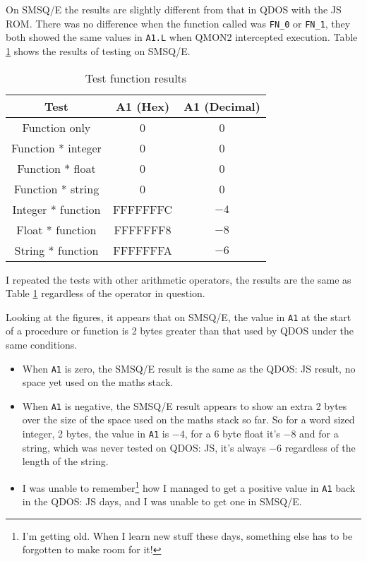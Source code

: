 On SMSQ/E the results are slightly different from that in QDOS with
the JS ROM. There was no difference when the function called was \texttt{FN\_0}
or \texttt{FN\_1}, they both showed the same values in \texttt{A1.L}
when QMON2 intercepted execution. Table \ref{tab:Test-function-results}
shows the results of testing on SMSQ/E.

\begin{table}[!h]
\begin{centering}
\begin{tabular}{|c|c|c|}
\hline 
\textbf{Test} & \textbf{A1 (Hex)} & \textbf{A1 (Decimal)}\tabularnewline
\hline 
\hline 
Function only & 0 & 0\tabularnewline
\hline 
Function {*} integer & 0 & 0\tabularnewline
\hline 
Function {*} float & 0 & 0\tabularnewline
\hline 
Function {*} string & 0 & 0\tabularnewline
\hline 
Integer {*} function & FFFFFFFC & $-4$\tabularnewline
\hline 
Float {*} function & FFFFFFF8 & $-8$\tabularnewline
\hline 
String {*} function & FFFFFFFA & $-6$\tabularnewline
\hline 
\end{tabular}
\par\end{centering}
\caption{Test function results\label{tab:Test-function-results}}

\end{table}

I repeated the tests with other arithmetic operators, the results
are the same as Table \ref{tab:Test-function-results} regardless
of the operator in question. 

Looking at the figures, it appears that on SMSQ/E, the value in \texttt{A1}
at the start of a procedure or function is 2 bytes greater than that
used by QDOS under the same conditions.
\begin{itemize}
\item When \texttt{A1} is zero, the SMSQ/E result is the same as the QDOS:
JS result, no space yet used on the maths stack.
\item When \texttt{A1} is negative, the SMSQ/E result appears to show an
extra 2 bytes over the size of the space used on the maths stack so
far. So for a word sized integer, 2 bytes, the value in \texttt{A1}
is $-4$, for a 6 byte float it's $-8$ and for a string, which was never
tested on QDOS: JS, it's always $-6$ regardless of the length of the
string.
\item I was unable to remember\footnote{I'm getting old. When I learn new stuff these days, something else
has to be forgotten to make room for it!} how I managed to get a positive value in \texttt{A1} back in the
QDOS: JS days, and I was unable to get one in SMSQ/E.
\end{itemize}

